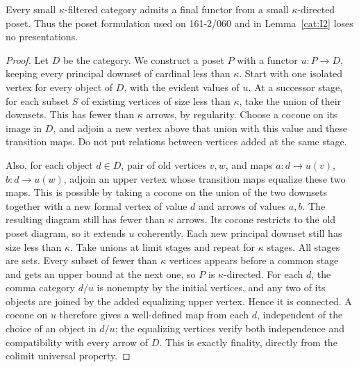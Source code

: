 \begin{lemma}\label{cat:I7}
Every small $\kappa$-filtered category admits a final functor from a
small $\kappa$-directed poset.  Thus the poset formulation used on
161-2/060 and in Lemma~\ref{cat:I2} loses no presentations.
\end{lemma}
\begin{proof}
Let $D$ be the category.  We construct a poset $P$ with a functor
$u:P\to D$, keeping every principal downset of cardinal less than
$\kappa$.  Start with one isolated vertex for every object of $D$,
with the evident values of $u$.  At a successor stage, for each subset
$S$ of existing vertices of size less than $\kappa$, take the union of
their downsets.  This has fewer than $\kappa$ arrows, by regularity.
Choose a cocone on its image in $D$, and adjoin a new vertex above
that union with this value and these transition maps.  Do not put
relations between vertices added at the same stage.

Also, for each object $d\in D$, pair of old vertices $v,w$, and maps
$a:d\to u(v)$, $b:d\to u(w)$, adjoin an upper vertex whose transition
maps equalize these two maps.  This is possible by taking a cocone on
the union of the two downsets together with a new formal vertex of
value $d$ and arrows of values $a,b$.  The resulting diagram still
has fewer than $\kappa$ arrows.  Its cocone restricts to the old
poset diagram, so it extends $u$ coherently.  Each new principal
downset still has size less than $\kappa$.
Take unions at limit stages and repeat for $\kappa$ stages.
All stages are sets.  Every subset of fewer than $\kappa$ vertices
appears before a common stage and gets an upper bound at the next
one, so $P$ is $\kappa$-directed.  For each $d$, the comma category
$d/u$ is nonempty by the initial vertices, and any two of its objects
are joined by the added equalizing upper vertex.  Hence it is connected.
A cocone on $u$ therefore gives a well-defined map from each $d$,
independent of the choice of an object in $d/u$; the equalizing
vertices verify both independence and compatibility with every arrow
of $D$.  This is exactly finality, directly from the colimit universal
property.
\end{proof}

